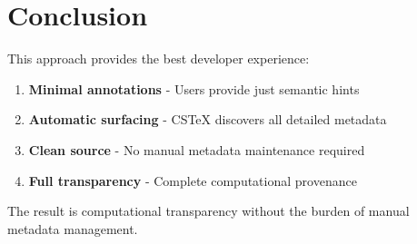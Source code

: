 \documentclass{article}
\begin{document}
\section{Conclusion}

This approach provides the best developer experience:
\begin{enumerate}
    \item \textbf{Minimal annotations} - Users provide just semantic hints
    \item \textbf{Automatic surfacing} - CSTeX discovers all detailed metadata
    \item \textbf{Clean source} - No manual metadata maintenance required
    \item \textbf{Full transparency} - Complete computational provenance
\end{enumerate}

The result is computational transparency without the burden of manual metadata management.
\end{document}
